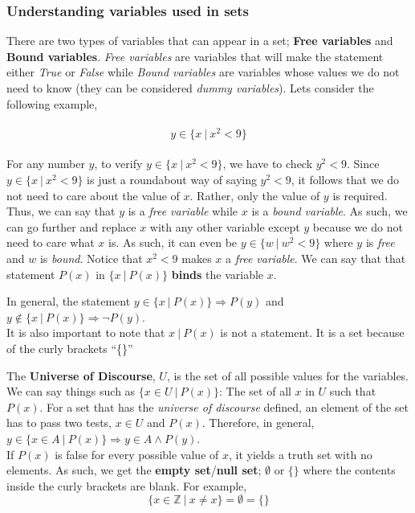 \documentclass[../setup.tex]{subfiles}
\begin{document}
\subsubsection{Understanding variables used in sets}
There are two types of variables that can appear in a set; \textbf{Free variables} and \textbf{Bound variables}. \textit{Free variables} are variables that will make the statement either \textit{True} or \textit{False} while \textit{Bound variables} are variables whose values we do not need to know (they can be considered \textit{dummy variables}). Lets consider the following example, \\
\\
 \[ y \in \{x \ | \ x^2 < 9\} \] 
\\
For any number $y$, to verify $y \in \{x \ | \ x^2 < 9\}$, we have to check $y^2 < 9$. Since $y \in \{x \ | \ x^2 < 9\}$ is just a roundabout way of saying $y^2 < 9$, it follows that we do not need to care about the value of $x$. Rather, only the value of $y$ is required. Thus, we can say that $y$ is a \textit{free variable} while $x$ is a \textit{bound variable}. As such, we can go further and replace $x$ with any other variable except $y$ because we do not need to care what $x$ is. As such, it can even be $y \in \{w\ | \ w^2 < 9\}$ where $y$ is \textit{free} and $w$ is \textit{bound}. Notice that $x^2 < 9$ makes $x$ a \textit{free variable}. We can say that that statement $P(x)$ in $\{x \ | \ P(x)\}$ \textbf{binds} the variable $x$. 


\begin{remark}
In general, the statement $y \in \{x\ |\ P(x)\} \Rightarrow P(y)$ and $y \notin \{x\ |\ P(x)\} \Rightarrow \lnot P(y)$. \\
It is also important to note that ${x\ |\ P(x)}$ is not a statement. It is a set because of the curly brackets ``\{\}''
\end{remark}

\begin{theorem}
The \textbf{Universe of Discourse}, $U$, is the set of all possible values for the variables. We can say things such as $\{x \in U\ |\ P(x)\}$: The set of all $x$ in $U$ such that $P(x)$. For a set that has the \textit{universe of discourse} defined, an element of the set has to pass two tests, $x \in U$ and $P(x)$. Therefore, in general, $y \in \{x\in A\ |\ P(x)\} \Rightarrow y\in A \land P(y)$. \\
If $P(x)$ is false for every possible value of $x$, it yields a truth set with no elements. As such, we get the \textbf{empty set}/\textbf{null set}; $\emptyset$ or $\{\}$ where the contents inside the curly brackets are blank. For example, \\
\[\{x\in\mathbb{Z} \ |\ x \neq x\} = \emptyset = \{\}\]
\end{theorem}
\end{document}
